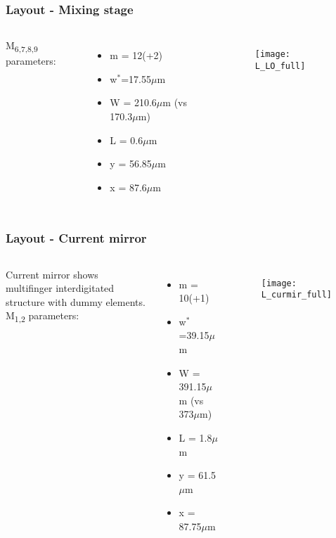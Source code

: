 \begin{frame}
\frametitle{Layout - Mixing stage}
	\begin{columns}
	M\textsubscript{6,7,8,9} parameters:
	\begin{itemize}
		\item m = 12(+2)
		\item w$^*$=17.55$\mu$m
		\item W = 210.6$\mu$m (vs 170.3$\mu$m)
		\item L = 0.6$\mu$m
		\item y = 56.85$\mu$m
		\item x = 87.6$\mu$m
	\end{itemize}
	\begin{figure}[H]
		\centering
		\texttt{[image: L\_LO\_full]}
		\label{L_LO_full}
	\end{figure}
	\end{columns}
\end{frame}

\begin{frame}
	\frametitle{Layout - Current mirror}
	\begin{columns}
		\column{0.4\textwidth}
		Current mirror shows multifinger interdigitated structure with dummy elements. M\textsubscript{1,2} parameters:
		\begin{itemize}
			\item m = 10(+1)
			\item w$^*$=39.15$\mu$m
			\item W = 391.15$\mu$m (vs 373$\mu$m)
			\item L = 1.8$\mu$m
			\item y = 61.5$\mu$m
			\item x = 87.75$\mu$m
		\end{itemize}
		\column{0.6\textwidth}
		\begin{figure}[H]
			\centering
			\texttt{[image: L\_curmir\_full]}
			\label{L_curmir_full}
		\end{figure}
	\end{columns}
\end{frame}

